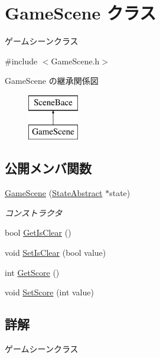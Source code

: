 \hypertarget{class_game_scene}{}\section{Game\+Scene クラス}
\label{class_game_scene}


ゲームシーンクラス  




{\ttfamily \#include $<$Game\+Scene.\+h$>$}

Game\+Scene の継承関係図\begin{figure}[H]
\begin{center}
\leavevmode
\includegraphics[height=2.000000cm]{class_game_scene}
\end{center}
\end{figure}
\subsection*{公開メンバ関数}
\begin{DoxyCompactItemize}
\item 
\mbox{\hyperlink{class_game_scene_a7c9e00b7dddd016d9c07f8cb49e7bbb2}{Game\+Scene}} (\mbox{\hyperlink{class_scene_bace_1_1_state_abstract}{State\+Abstract}} $\ast$state)
\begin{DoxyCompactList}\small\item\em コンストラクタ \end{DoxyCompactList}\item 
bool \mbox{\hyperlink{class_game_scene_afb9c99f2e9b94bfc4f151bed83b1a522}{Get\+Is\+Clear}} ()
\item 
void \mbox{\hyperlink{class_game_scene_aac6f0f69d7ad5745e49f41425d7df793}{Set\+Is\+Clear}} (bool value)
\item 
int \mbox{\hyperlink{class_game_scene_a903dffd64231c226daf27f22893893d8}{Get\+Score}} ()
\item 
void \mbox{\hyperlink{class_game_scene_aec5425818644ea2cb22ccffc89c56378}{Set\+Score}} (int value)
\end{DoxyCompactItemize}


\subsection{詳解}
ゲームシーンクラス 

